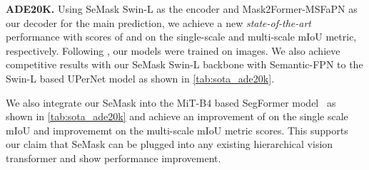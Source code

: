 \documentclass[10pt,twocolumn,letterpaper]{article}
\begin{document}
\noindent
\textbf{ADE20K.} 
Using SeMask Swin-L as the encoder and Mask2Former-MSFaPN as our decoder for the main prediction, we achieve a new \textit{state-of-the-art} performance with scores of  and  on the single-scale and multi-scale mIoU metric, respectively. Following \cite{swin-T}, our models were trained on  images. We also achieve competitive results with our SeMask Swin-L backbone with Semantic-FPN to the Swin-L based UPerNet model as shown in \cref{tab:sota_ade20k}.

We also integrate our SeMask into the MiT-B4 based SegFormer model~\cite{segformer} as shown in \cref{tab:sota_ade20k} and achieve an improvement of  on the single scale mIoU and  improvememt on the multi-scale mIoU metric scores. This supports our claim that SeMask can be plugged into any existing hierarchical vision transformer and show performance improvement.

\begin{table}
  \centering
  \fontsize{10}{12}\selectfont
{}
  \vspace{-2mm}
  \caption{\textbf{SOTA Comparison on Cityscapes-Validation.} 
      We report both single-scale (s.s.) and multi-scale (m.s.) mIOU~() on \textit{Cityscapes Validation set}.}
    \label{tab:sota_cityscapes}
\end{table}
\end{document}
